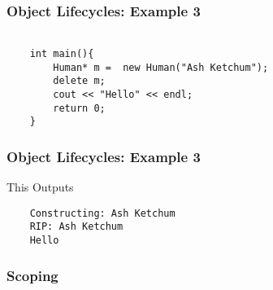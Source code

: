 \documentclass{beamer}
\begin{document}
\begin{frame}[fragile]
    \frametitle{Object Lifecycles: Example 3}
    \begin{verbatim}

    int main(){
        Human* m =  new Human("Ash Ketchum");
        delete m;
        cout << "Hello" << endl;
        return 0;
    }
    \end{verbatim}
\end{frame}
\begin{frame}[fragile]
    \frametitle{Object Lifecycles: Example 3}
    This Outputs
    \begin{verbatim}
    Constructing: Ash Ketchum
    RIP: Ash Ketchum
    Hello
    \end{verbatim}

\end{frame}

\begin{frame}
    \frametitle{Scoping}
    
\end{frame}
\end{document}

